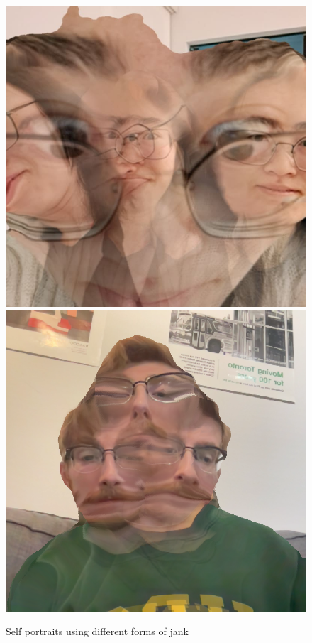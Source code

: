 \documentclass[twocolumn]{article}
\begin{document}
\begin{figure}
    \centering
    \includegraphics[width=0.48\linewidth]{img/anna.jpg}
    \includegraphics[width=0.48\linewidth]{img/cerberus.png}
    \caption{Self portraits using different forms of jank}
    \label{fig:self}
\end{figure}
\end{document}

